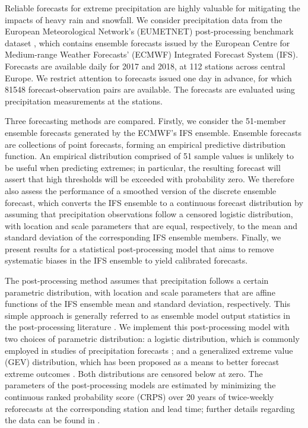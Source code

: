 \documentclass[12pt]{article}
\newcommand{\1}{\mathbf{1}} %
\theoremstyle{definition}
\begin{document}
Reliable forecasts for extreme precipitation are highly valuable for mitigating the impacts of heavy rain and snowfall. We consider precipitation data from the European Meteorological Network's (EUMETNET) post-processing benchmark dataset \citep[EUPPBench;][]{DemaeyerEtAl2023}, which contains ensemble forecasts issued by the European Centre for Medium-range Weather Forecasts' (ECMWF) Integrated Forecast System (IFS). Forecasts are available daily for 2017 and 2018, at 112 stations across central Europe. We restrict attention to forecasts issued one day in advance, for which 81548 forecast-observation pairs are available. The forecasts are evaluated using precipitation measurements at the stations.

Three forecasting methods are compared. Firstly, we consider the 51-member ensemble forecasts generated by the ECMWF's IFS ensemble. Ensemble forecasts are collections of point forecasts, forming an empirical predictive distribution function. An empirical distribution comprised of 51 sample values is unlikely to be useful when predicting extremes; in particular, the resulting forecast will assert that high thresholds will be exceeded with probability zero. We therefore also assess the performance of a smoothed version of the discrete ensemble forecast, which converts the IFS ensemble to a continuous forecast distribution by assuming that precipitation observations follow a censored logistic distribution, with location and scale parameters that are equal, respectively, to the mean and standard deviation of the corresponding IFS ensemble members. Finally, we present results for a statistical post-processing model that aims to remove systematic biases in the IFS ensemble to yield calibrated forecasts.

The post-processing method assumes that precipitation follows a certain parametric distribution, with location and scale parameters that are affine functions of the IFS ensemble mean and standard deviation, respectively. This simple approach is generally referred to as ensemble model output statistics in the post-processing literature \citep{GneitingEtAl2005}. We implement this post-processing model with two choices of parametric distribution: a logistic distribution, which is commonly employed in studies of precipitation forecasts \citep[see e.g.][]{MessnerEtAl2014}; and a generalized extreme value (GEV) distribution, which has been proposed as a means to better forecast extreme outcomes \citep{LerchThorarinsdottir2013,Scheuerer2014}. Both distributions are censored below at zero. The parameters of the post-processing models are estimated by minimizing the continuous ranked probability score (CRPS) over 20 years of twice-weekly reforecasts at the corresponding station and lead time; further details regarding the data can be found in \cite{DemaeyerEtAl2023}.
\end{document}
